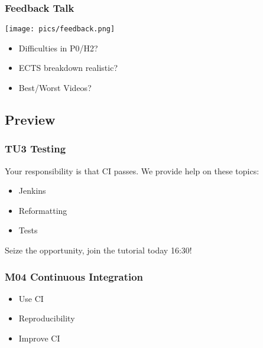 \begin{frame}
	\frametitle{Feedback Talk}

	\hfill \texttt{[image: pics/feedback.png]}
	\vspace{-1cm}
	\begin{itemize}
		\item Difficulties in P0/H2?
		\item ECTS breakdown realistic?
		\item Best/Worst Videos?
	\end{itemize}
\end{frame}

\subsection{Preview}

\begin{frame}
	\frametitle{TU3 Testing}

	Your responsibility is that CI passes. We provide help on these topics:

	\begin{itemize}
	\item Jenkins
	\item Reformatting
	\item Tests
	\end{itemize}

	\begin{task}
	Seize the opportunity, join the tutorial today 16:30!
	\end{task}
\end{frame}

\begin{frame}
	\frametitle{M04 Continuous Integration}

	\begin{itemize}
	\item Use CI
	\item Reproducibility
	\item Improve CI
	\end{itemize}
\end{frame}




